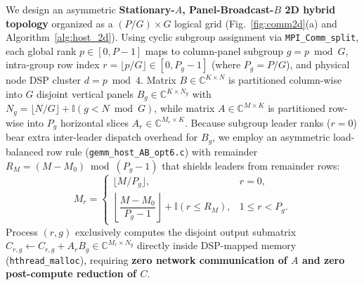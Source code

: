 \documentclass[journal]{IEEEtran}
\begin{document}
We design an asymmetric \textbf{Stationary-$A$, Panel-Broadcast-$B$ 2D hybrid topology} organized as a $(P/G) \times G$ logical grid (Fig.~\ref{fig:comm2d}(a) and Algorithm~\ref{alg:host_2d}). Using cyclic subgroup assignment via \texttt{MPI\_Comm\_split}, each global rank $p \in [0, P-1]$ maps to column-panel subgroup $g = p \bmod G$, intra-group row index $r = \lfloor p / G \rfloor \in [0, P_g - 1]$ (where $P_g = P/G$), and physical node DSP cluster $d = p \bmod 4$. Matrix $B \in \mathbb{C}^{K \times N}$ is partitioned column-wise into $G$ disjoint vertical panels $B_g \in \mathbb{C}^{K \times N_g}$ with $N_g = \lfloor N/G \rfloor + \mathbb{I}(g < N \bmod G)$, while matrix $A \in \mathbb{C}^{M \times K}$ is partitioned row-wise into $P_g$ horizontal slices $A_r \in \mathbb{C}^{M_r \times K}$. Because subgroup leader ranks ($r = 0$) bear extra inter-leader dispatch overhead for $B_g$, we employ an asymmetric load-balanced row rule (\texttt{gemm\_host\_AB\_opt6.c}) with remainder $R_M = (M - M_0) \bmod (P_g - 1)$ that shields leaders from remainder rows:
\begin{equation}
M_r = \begin{cases}
\lfloor M / P_g \rfloor, & r = 0, \\[3pt]
\left\lfloor \dfrac{M - M_0}{P_g - 1} \right\rfloor + \mathbb{I}(r \le R_M), & 1 \le r < P_g.
\end{cases}
\label{eq:row_alloc}
\end{equation}
Process $(r, g)$ exclusively computes the disjoint output submatrix $C_{r,g} \leftarrow C_{r,g} + A_r B_g \in \mathbb{C}^{M_r \times N_g}$ directly inside DSP-mapped memory (\texttt{hthread\_malloc}), requiring \textbf{zero network communication of $A$ and zero post-compute reduction of $C$}.
\end{document}
